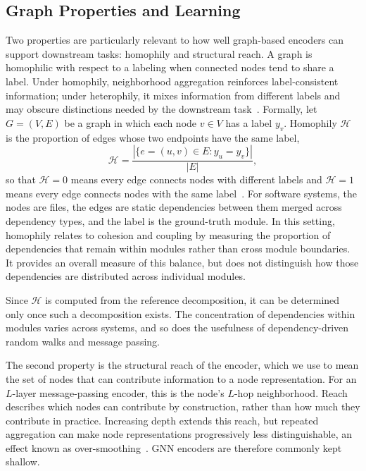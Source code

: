 \subsection{Graph Properties and Learning \label{sec:bg_properties}}

Two properties are particularly relevant to how well graph-based encoders can support downstream tasks: homophily and structural reach. A graph is homophilic with respect to a labeling when connected nodes tend to share a label. Under homophily, neighborhood aggregation reinforces label-consistent information; under heterophily, it mixes information from different labels and may obscure distinctions needed by the downstream task~\cite{gnn_homophily}. Formally, let $G=(V,E)$ be a graph in which each node $v \in V$ has a label $y_v$. Homophily $\mathcal{H}$ is the proportion of edges whose two endpoints have the same label,
\begin{equation}
\mathcal{H} = \frac{|\{e=(u,v) \in E : y_u = y_v\}|}{|E|},
\label{eq:homophily}
\end{equation}
so that $\mathcal{H}=0$ means every edge connects nodes with different labels and $\mathcal{H}=1$ means every edge connects nodes with the same label~\cite{gnn_homophily}. For software systems, the nodes are files, the edges are static dependencies between them merged across dependency types, and the label is the ground-truth module. In this setting, homophily relates to cohesion and coupling by measuring the proportion of dependencies that remain within modules rather than cross module boundaries. It provides an overall measure of this balance, but does not distinguish how those dependencies are distributed across individual modules.

Since $\mathcal{H}$ is computed from the reference decomposition, it can be determined only once such a decomposition exists. The concentration of dependencies within modules varies across systems, and so does the usefulness of dependency-driven random walks and message passing.

The second property is the structural reach of the encoder, which we use to mean the set of nodes that can contribute information to a node representation. For an $L$-layer message-passing encoder, this is the node's $L$-hop neighborhood. Reach describes which nodes can contribute by construction, rather than how much they contribute in practice. Increasing depth extends this reach, but repeated aggregation can make node representations progressively less distinguishable, an effect known as over-smoothing~\cite{gnn_oversmoothing}. GNN encoders are therefore commonly kept shallow.

